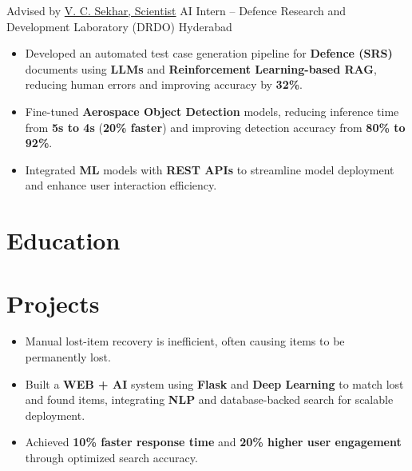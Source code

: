 \documentclass[10pt,a4paper,sans]{moderncv}
\begin{document}
  {Advised by \href{https://www.linkedin.com/in/chandra-sekhar-vaddi-a19a6599/}{\textcolor{color1}{V. C. Sekhar, Scientist}}}
  {AI Intern -- Defence Research and Development Laboratory (DRDO)}
  {Hyderabad}{}{}
\vspace{-0.3cm}
\begin{itemize}[leftmargin=*, itemsep=2pt, topsep=2pt, parsep=0pt]
  \item Developed an automated test case generation pipeline for \textbf{Defence (SRS)} documents using \textbf{LLMs} and \textbf{Reinforcement Learning-based RAG}, reducing human errors and improving accuracy by \textbf{32\%}.
  \item Fine-tuned \textbf{Aerospace Object Detection} models, reducing inference time from \textbf{5s to 4s} (\textbf{20\% faster}) and improving detection accuracy from \textbf{80\% to 92\%}.
  \item Integrated \textbf{ML} models with \textbf{REST APIs} to streamline model deployment and enhance user interaction efficiency.
\end{itemize}

\vspace{-0.15cm}
\section{Education}
\vspace{-0.05cm}

\vspace{-0.15cm}
\section{Projects}
\vspace{-0.15cm}

\vspace{-0.3cm}
\begin{itemize}[leftmargin=*, itemsep=2pt, topsep=2pt, parsep=0pt]
  \item Manual lost-item recovery is inefficient, often causing items to be permanently lost.
  \item Built a \textbf{WEB + AI} system using \textbf{Flask} and \textbf{Deep Learning} to match lost and found items, integrating \textbf{NLP} and database-backed search for scalable deployment.
  \item Achieved \textbf{10\% faster response time} and \textbf{20\% higher user engagement} through optimized search accuracy.
\end{itemize}
\end{document}
